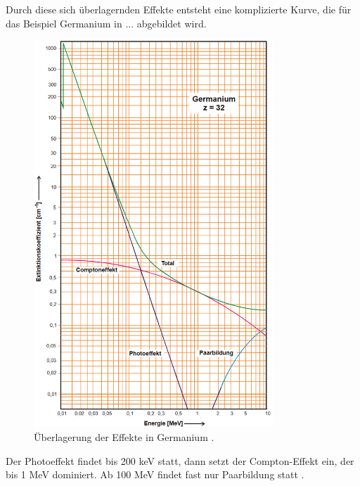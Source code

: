 Durch diese sich überlagernden Effekte entsteht eine komplizierte Kurve, die für das Beispiel Germanium in ... abgebildet wird. 
\begin{figure}[H]
    \centering
    \includegraphics[width = 9cm]{content/1}
    \caption{Überlagerung der Effekte in Germanium \cite{sample}.}
    \label{1}
  \end{figure}
Der Photoeffekt findet bis 200 keV statt, dann setzt der Compton-Effekt ein, der bis 1 MeV dominiert. Ab 100 MeV findet fast nur Paarbildung statt \cite{sample}. 

